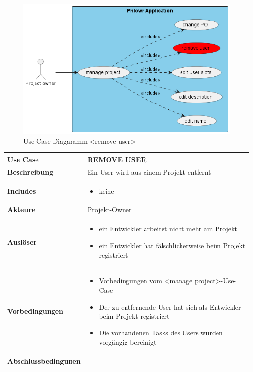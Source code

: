 \begin{figure}[H]
    \begin{center}
      \includegraphics[width=0.3\linewidth]{../content/diagrams/usecase/manageProject/manageProjectUseCaseRemoveUserSelected.png}
      \caption{Use Case Diagaramm <remove user> }
    \end{center}
  \end{figure}

  \begin{table}[H]
    \centering
    \settowidth{}
    \setlength\extrarowheight{2pt}
    \begin{tabulary}{1.0\textwidth}{|m{4cm}|m{9cm}|}
      \hline
      \textbf{Use Case} &
      \textbf{REMOVE USER}\\
      \hline
      \textbf{Beschreibung} &
      Ein User wird aus einem Projekt entfernt\\ 
      \hline
      \textbf{Includes} &
      \begin{itemize}
       \item keine
        \end{itemize}\\
        \hline  
      \textbf{Akteure} &
      Projekt-Owner\\ 
      \hline
      \textbf{Auslöser} &
      \begin{itemize}
        \item ein Entwickler arbeitet nicht mehr am Projekt
        \item ein Entwickler hat fälschlicherweise beim Projekt registriert
         \end{itemize}\\  
      \hline
      \textbf{Vorbedingungen} &
      \begin{itemize}
        \item Vorbedingungen vom <manage project>-Use-Case
        \item Der zu entfernende User hat sich als Entwickler beim Projekt registriert
        \item Die vorhandenen Tasks des Users wurden vorgängig bereinigt
      \end{itemize}\\  
      \hline
      \textbf{Abschlussbedingunen} &

\end{tabulary}
\end{table}
